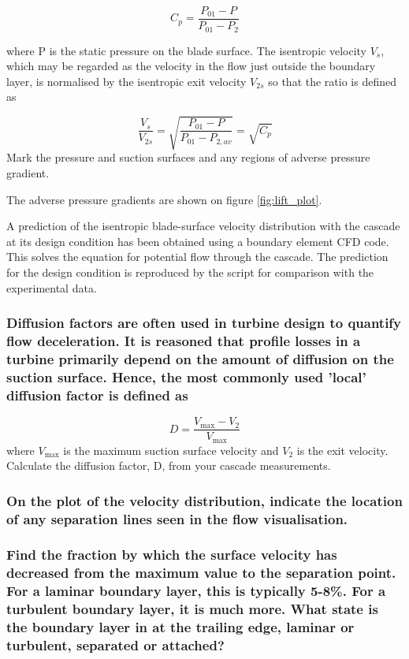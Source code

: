 \documentclass{article}
\begin{document}
\begin{equation}
    C_p = \frac{P_{01} - P}{P_{01} - P_2}
\end{equation}

where P is the static pressure on the blade surface. The isentropic velocity
$V_s$, which may be
regarded as the velocity in the flow just outside the boundary layer, is normalised by the
isentropic exit velocity
$V_{2s}$ so that the ratio is defined as

\begin{equation}
    \frac{V_s}{V_{2s}} = \sqrt{\frac{P_{01} - P}{P_{01} - P_{2,av}}} = \sqrt{C_p}
\end{equation}
Mark the pressure and suction surfaces and any regions of adverse pressure gradient.

The adverse pressure gradients are shown on figure \ref{fig:lift_plot}.

A prediction of the isentropic blade-surface velocity distribution with the cascade at its
design condition has been obtained using a boundary element CFD code. This solves the
equation for potential flow through the cascade. The prediction for the design condition is
reproduced by the script for comparison with the experimental data.

\subsubsection{Diffusion factors are often used in turbine design to quantify flow deceleration. It is
reasoned that profile losses in a turbine primarily depend on the amount of diffusion on the
suction surface. Hence, the most commonly used 'local' diffusion factor is defined as
}

\begin{equation}
    D = \frac{V_\text{max} - V_2}{V_\text{max}}
\end{equation}
where
$V_\text{max}$ is the maximum suction surface velocity and
$V_2$ is the exit velocity. Calculate the
diffusion factor, D, from your cascade measurements.

\subsubsection{On the plot of the velocity distribution, indicate the location of any separation lines seen
in the flow visualisation.}


\subsubsection{Find the fraction by which the surface velocity has decreased from the maximum value
to the separation point. For a laminar boundary layer, this is typically 5-8\%. For a turbulent
boundary layer, it is much more. What state is the boundary layer in at the trailing edge, laminar
or turbulent, separated or attached?}
\end{document}
